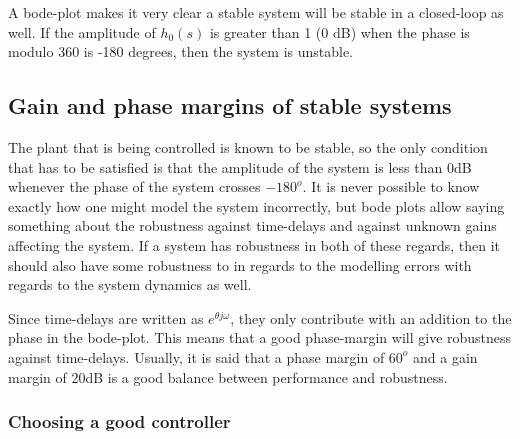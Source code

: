 \noindent
A bode-plot makes it very clear a stable system will be stable in a closed-loop as well. If the amplitude of $h_0(s)$ is greater than 1 (0 dB) when the phase is modulo 360 is -180 degrees, then the system is unstable. 



\subsection{Gain and phase margins of stable systems}


The plant that is being controlled is known to be stable, so the only condition that has to be satisfied is that the amplitude of the system is less than 0dB whenever the phase of the system crosses $-180^o$. It is never possible to know exactly how one might model the system incorrectly, but bode plots allow saying something about the robustness against time-delays and against unknown gains affecting the system. If a system has robustness in both of these regards, then it should also have some robustness to in regards to the modelling errors with regards to the system dynamics as well. 


\noindent
Since time-delays are written as $e^{\theta j \omega}$, they only contribute with an addition to the phase in the bode-plot. This means that a good phase-margin will give robustness against time-delays. Usually, it is said that a phase margin of $60^o$ and a gain margin of 20dB is a good balance between performance and robustness. 



\noindent

\subsubsection{Choosing a good controller}

